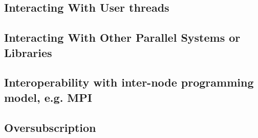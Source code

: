 \subsection{Interacting With User threads}


\subsection{Interacting With Other Parallel Systems or Libraries}


\subsection{Interoperability with inter-node programming model, e.g. MPI}


\subsection{Oversubscription}



